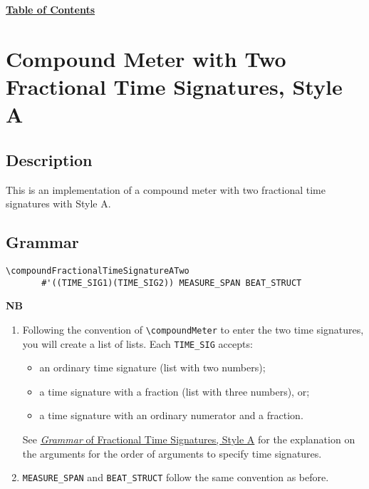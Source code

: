 \hyperref[sec:toc]{\textbf{Table of Contents}}

\vfill \break




\section {Compound Meter with Two Fractional Time Signatures, Style A}

\hfill
{}
\hfill

\subsection{Description}
This is an implementation of a compound meter with two fractional time signatures with Style A.  

\subsection{Grammar}
\begin{verbatim}
\compoundFractionalTimeSignatureATwo
       #'((TIME_SIG1)(TIME_SIG2)) MEASURE_SPAN BEAT_STRUCT
\end{verbatim}
\textbf{NB} 
\begin{enumerate}
\item Following the convention of \verb|\compoundMeter| to enter the two time signatures, you will create a list of lists. Each \verb|TIME_SIG| accepts:\\
\begin{itemize} 
\item an ordinary time signature (list with two numbers); 
\item a time signature with a fraction (list with three numbers), or;
\item a time signature with an ordinary numerator and a fraction.
\end{itemize} 
See \hyperref[sec:time_signatures_styleA_convention]{\textit{Grammar} of Fractional Time Signatures, Style A} for the explanation on the arguments for the order of arguments to specify time signatures.
\item \verb|MEASURE_SPAN| and \verb|BEAT_STRUCT| follow the same convention as before.
\end{enumerate}
